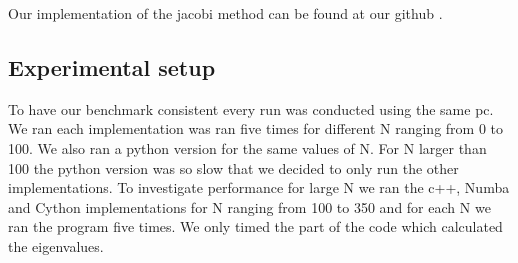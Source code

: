 Our implementation of the jacobi method can be found at our github \cite{github}.

\subsection*{Experimental setup}
To have our benchmark consistent every run was conducted using the same pc. We
ran each implementation was ran five times for different N ranging from 0 to
100. We also ran a python version for the same values of N. For N larger than
100 the python version was so slow that we decided to only run the other
implementations. To investigate performance for large N we ran the c++, Numba
and Cython implementations for N ranging from 100 to 350 and for each N we
ran the program five times. We only timed the part of the code which calculated
the eigenvalues.
